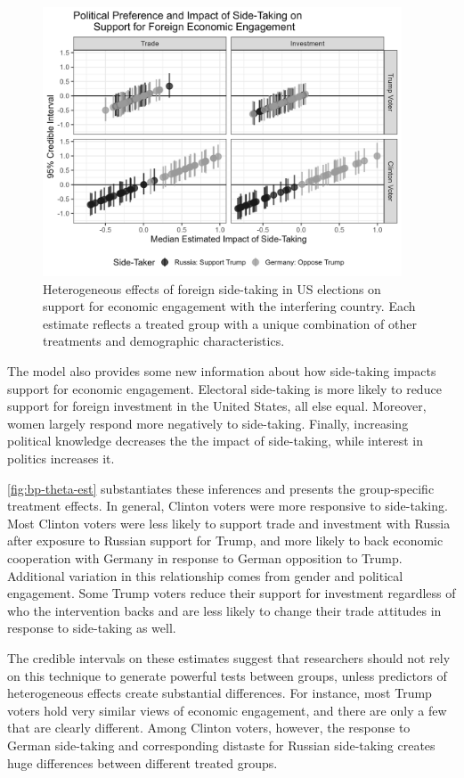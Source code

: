\documentclass[12pt]{article}
\begin{document}
\begin{figure}[htpb]
	\centering
		\includegraphics[width=0.95\textwidth]{../figures/bp-theta-est.png}
	\caption{Heterogeneous effects of foreign side-taking in US elections on support for economic engagement with the interfering country. Each estimate reflects a treated group with a unique combination of other treatments and demographic characteristics.}
	\label{fig:bp-theta-est}
\end{figure}


The model also provides some new information about how side-taking impacts support for economic engagement. 
Electoral side-taking is more likely to reduce support for foreign investment in the United States, all else equal. 
Moreover, women largely respond more negatively to side-taking. 
Finally, increasing political knowledge decreases the the impact of side-taking, while interest in politics increases it. 


\autoref{fig:bp-theta-est} substantiates these inferences and presents the group-specific treatment effects. 
In general, Clinton voters were more responsive to side-taking. 
Most Clinton voters were less likely to support trade and investment with Russia after exposure to Russian support for Trump, and more likely to back economic cooperation with Germany in response to German opposition to Trump. 
Additional variation in this relationship comes from gender and political engagement.
Some Trump voters reduce their support for investment regardless of who the intervention backs and are less likely to change their trade attitudes in response to side-taking as well. 


The credible intervals on these estimates suggest that researchers should not rely on this technique to generate powerful tests between groups, unless predictors of heterogeneous effects create substantial differences. 
For instance, most Trump voters hold very similar views of economic engagement, and there are only a few that are clearly different. 
Among Clinton voters, however, the response to German side-taking and corresponding distaste for Russian side-taking creates huge differences between different treated groups. 
\end{document}
